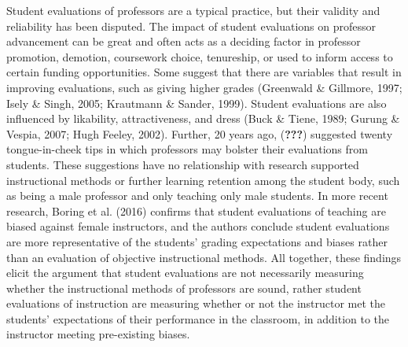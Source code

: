 \documentclass[man]{apa6}
\newcounter{author}
\theoremstyle{definition}
\theoremstyle{definition}
\theoremstyle{definition}
\theoremstyle{remark}
\begin{document}
Student evaluations of professors are a typical practice, but their
validity and reliability has been disputed. The impact of student
evaluations on professor advancement can be great and often acts as a
deciding factor in professor promotion, demotion, coursework choice,
tenureship, or used to inform access to certain funding opportunities.
Some suggest that there are variables that result in improving
evaluations, such as giving higher grades (Greenwald \& Gillmore, 1997;
Isely \& Singh, 2005; Krautmann \& Sander, 1999). Student evaluations
are also influenced by likability, attractiveness, and dress (Buck \&
Tiene, 1989; Gurung \& Vespia, 2007; Hugh Feeley, 2002). Further, 20
years ago, ({\textbf{???}}) suggested twenty tongue-in-cheek tips in
which professors may bolster their evaluations from students. These
suggestions have no relationship with research supported instructional
methods or further learning retention among the student body, such as
being a male professor and only teaching only male students. In more
recent research, Boring et al. (2016) confirms that student evaluations
of teaching are biased against female instructors, and the authors
conclude student evaluations are more representative of the students'
grading expectations and biases rather than an evaluation of objective
instructional methods. All together, these findings elicit the argument
that student evaluations are not necessarily measuring whether the
instructional methods of professors are sound, rather student
evaluations of instruction are measuring whether or not the instructor
met the students' expectations of their performance in the classroom, in
addition to the instructor meeting pre-existing biases.
\end{document}
